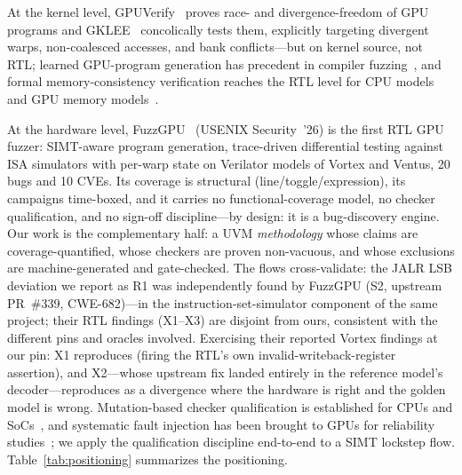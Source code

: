 \documentclass[conference]{IEEEtran}
\begin{document}
At the kernel level, GPUVerify~\cite{gpuverify}
proves race- and divergence-freedom of GPU programs and
GKLEE~\cite{gklee} concolically tests them, explicitly targeting
divergent warps, non-coalesced accesses, and bank conflicts---but on
kernel source, not RTL; learned GPU-program generation has precedent in
compiler fuzzing~\cite{deepsmith}, and formal memory-consistency
verification reaches the RTL level for CPU models~\cite{rtlcheck} and
GPU memory models~\cite{ptxmem}.

At the hardware level, FuzzGPU~\cite{fuzzgpu}
(USENIX Security~'26) is the first RTL GPU fuzzer: SIMT-aware program
generation, trace-driven differential testing against ISA simulators
with per-warp state on Verilator models of Vortex and Ventus, 20 bugs
and 10 CVEs. Its coverage is structural (line/toggle/expression), its
campaigns time-boxed, and it carries no functional-coverage model, no
checker qualification, and no sign-off discipline---by design: it is a
bug-discovery engine. Our work is the complementary half: a UVM
\emph{methodology} whose claims are coverage-quantified, whose checkers
are proven non-vacuous, and whose exclusions are machine-generated and
gate-checked. The flows cross-validate: the JALR LSB deviation we
report as R1 was independently found by FuzzGPU (S2, upstream
PR~\#339, CWE-682)---in the instruction-set-simulator component of the
same project; their RTL findings (X1--X3) are disjoint from ours,
consistent with the
different pins and oracles involved. Exercising their reported Vortex
findings at our pin: X1 reproduces (firing the RTL's own
invalid-writeback-register assertion), and X2---whose upstream fix
landed entirely in the reference model's decoder---reproduces as a
divergence where the hardware is right and the golden model is wrong. Mutation-based checker qualification is established
for CPUs and SoCs~\cite{vacuity-date10}, and systematic fault injection
has been brought to GPUs for reliability studies~\cite{nvbitfi}; we
apply the qualification discipline end-to-end to a SIMT lockstep flow.
Table~\ref{tab:positioning} summarizes the positioning.
\end{document}

